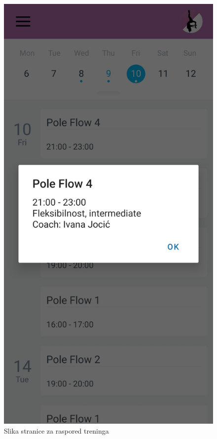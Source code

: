 \documentclass[times, utf8, zavrsni]{fer}
\begin{document}
			\begin{figure}[H]
        			\includegraphics[scale=0.2]{slike/App_info_treninga.jpg}
        			\centering
        			\caption{Slika stranice za raspored treninga}
        			\label{fig:promjene}
        		\end{figure}
			    
\end{document}
